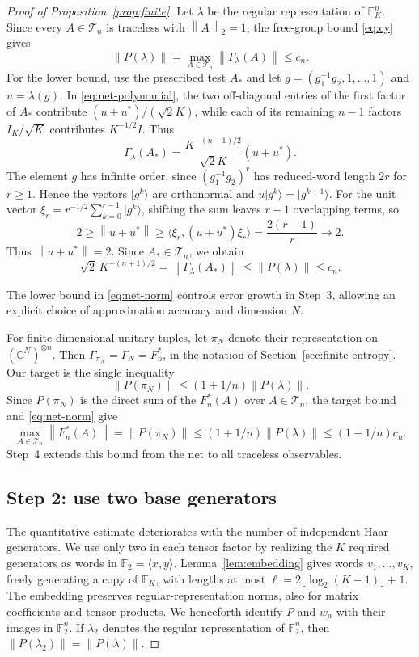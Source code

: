 \documentclass[11pt]{article}
\numberwithin{equation}{section}
\theoremstyle{boldremark}\newtheorem{remark}[theorem]{Remark}
\newcommand{\C}{\mathbb C}
\newcommand{\F}{\mathbb F}
\newcommand{\norm}[1]{\left\lVert #1\right\rVert}
\newcommand{\ket}[1]{\lvert #1\rangle}
\begin{document}
\begin{proof}[Proof of Proposition~\ref{prop:finite}]
Let $\lambda$ be the regular representation of $\F_K^n$.
Since every $A\in\mathcal T_n$ is traceless with $\norm A_2=1$,
the free-group bound \eqref{eq:cy} gives
\[
 \norm{P(\lambda)}
 =\max_{A\in\mathcal T_n}\norm{\Gamma_\lambda(A)}\le c_n.
\]
For the lower bound, use the prescribed test $A_*$ and let
$g=(g_1^{-1}g_2,1,\ldots,1)$ and $u=\lambda(g)$.
In \eqref{eq:net-polynomial}, the two off-diagonal entries of the
first factor of $A_*$ contribute $(u+u^*)/(\sqrt2K)$, while each
of its remaining $n-1$ factors $I_K/\sqrt K$ contributes
$K^{-1/2}I$. Thus
\[
 \Gamma_\lambda(A_*)
 =\frac{K^{-(n-1)/2}}{\sqrt2K}(u+u^*).
\]
The element $g$ has infinite order, since $(g_1^{-1}g_2)^r$ has
reduced-word length $2r$ for $r\ge1$. Hence the vectors $\ket{g^k}$
are orthonormal and $u\ket{g^k}=\ket{g^{k+1}}$.
For the unit vector $\xi_r=r^{-1/2}\sum_{k=0}^{r-1}\ket{g^k}$,
shifting the sum leaves $r-1$ overlapping terms, so
\[
 2\ge\norm{u+u^*}
 \ge\langle\xi_r,(u+u^*)\xi_r\rangle
 =\frac{2(r-1)}r\longrightarrow2.
\]
Thus $\norm{u+u^*}=2$. Since $A_*\in\mathcal T_n$, we obtain
\begin{equation}
 \sqrt2\,K^{-(n+1)/2}
 =\norm{\Gamma_\lambda(A_*)}\le\norm{P(\lambda)}\le c_n.
 \label{eq:net-norm}
\end{equation}

The lower bound in \eqref{eq:net-norm} controls error growth in Step~3,
allowing an explicit choice of approximation accuracy and dimension $N$.

For finite-dimensional unitary tuples, let $\pi_N$ denote their
representation on $(\C^N)^{\otimes n}$. Then
$\Gamma_{\pi_N}=\Gamma_N=F_n^*$, in the notation of
Section~\ref{sec:finite-entropy}. Our target is the single inequality
\begin{equation}
 \norm{P(\pi_N)}\le(1+1/n)\norm{P(\lambda)}.
 \label{eq:polynomial-target}
\end{equation}
Since $P(\pi_N)$ is the direct sum of the $F_n^*(A)$ over
$A\in\mathcal T_n$, the target bound and \eqref{eq:net-norm} give
\[
 \max_{A\in\mathcal T_n}\norm{F_n^*(A)}
 =\norm{P(\pi_N)}
 \le(1+1/n)\norm{P(\lambda)}
 \le(1+1/n)c_n.
\]
Step~4 extends this bound from the net to all traceless observables.

\subsection{Step 2: use two base generators}
\label{sec:two-generators}

The quantitative estimate deteriorates with the number of independent
Haar generators. We use only two in each tensor factor by realizing
the $K$ required generators as words in $\F_2=\langle x,y\rangle$.
Lemma~\ref{lem:embedding} gives words
$v_1,\ldots,v_K$, freely generating a copy of $\F_K$, with lengths at most $\ell=2\lfloor\log_2(K-1)\rfloor+1$.
The embedding preserves regular-representation norms, also for matrix
coefficients and tensor products. We henceforth identify $P$ and $w_a$
with their images in $\F_2^n$. If $\lambda_2$ denotes the regular
representation of $\F_2^n$, then $\norm{P(\lambda_2)}=\norm{P(\lambda)}$.


\end{proof}
\end{document}
